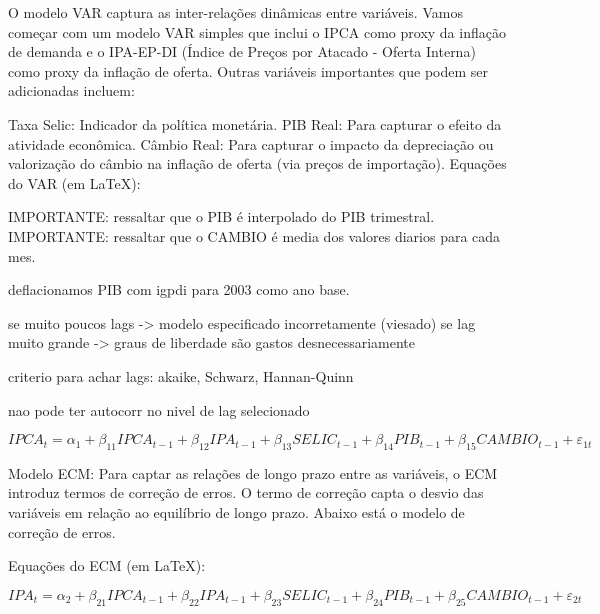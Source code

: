 \documentclass[12pt,oneside,a4paper,chapter=TITLE,english,brazil,sumario=abnt-6027-2012]{abntex2}
\begin{document}
O modelo VAR captura as inter-relações dinâmicas entre variáveis. Vamos começar com um modelo VAR simples que inclui o IPCA como proxy da inflação de demanda e o IPA-EP-DI (Índice de Preços por Atacado - Oferta Interna) como proxy da inflação de oferta. Outras variáveis importantes que podem ser adicionadas incluem:

Taxa Selic: Indicador da política monetária.
PIB Real: Para capturar o efeito da atividade econômica.
Câmbio Real: Para capturar o impacto da depreciação ou valorização do câmbio na inflação de oferta (via preços de importação).
Equações do VAR (em LaTeX):


IMPORTANTE: ressaltar que o PIB é interpolado do PIB trimestral.
IMPORTANTE: ressaltar que o CAMBIO é media dos valores diarios para cada mes.

deflacionamos PIB com igpdi para 2003 como ano base.

se muito poucos lags -> modelo especificado incorretamente (viesado)
se lag muito grande -> graus de liberdade são gastos desnecessariamente

criterio para achar lags: akaike, Schwarz, Hannan-Quinn

nao pode ter autocorr no nivel de lag selecionado

\begin{equation}
	IPCA_t = \alpha_1 + \beta_{11}IPCA_{t-1} + \beta_{12}IPA_{t-1} + \beta_{13}SELIC_{t-1} + \beta_{14}PIB_{t-1} + \beta_{15}CAMBIO_{t-1} + \varepsilon_{1t}
\end{equation}

Modelo ECM:
Para captar as relações de longo prazo entre as variáveis, o ECM introduz termos de correção de erros. O termo de correção capta o desvio das variáveis em relação ao equilíbrio de longo prazo. Abaixo está o modelo de correção de erros.

Equações do ECM (em LaTeX):

\begin{equation}
	IPA_t  = \alpha_2 + \beta_{21}IPCA_{t-1} + \beta_{22}IPA_{t-1} + \beta_{23}SELIC_{t-1} + \beta_{24}PIB_{t-1} + \beta_{25}CAMBIO_{t-1} + \varepsilon_{2t}
\end{equation}
\end{document}
